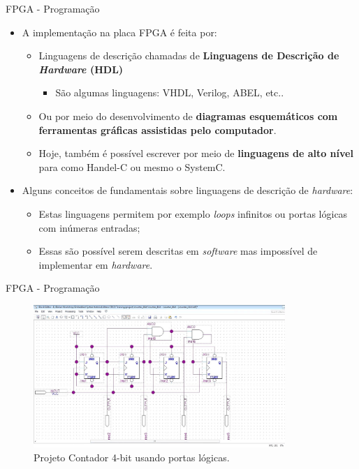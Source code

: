 	\begin{frame}{FPGA - Programação}
		\begin{itemize}
			\setlength\itemsep{1.0em}
			\item A implementação na placa FPGA é feita por:
			\begin{itemize}
				\setlength\itemsep{0.5em}
				\item Linguagens de descrição chamadas de \textbf{Linguagens de Descrição de \textit{Hardware} (HDL)}
				\begin{itemize}
					\item São algumas linguagens: VHDL, Verilog, ABEL, etc..
				\end{itemize}

				\item Ou por meio do desenvolvimento de \textbf{diagramas esquemáticos com ferramentas gráficas assistidas pelo computador}.

				\item Hoje, também é possível escrever por meio de \textbf{linguagens de alto nível} para como Handel-C ou mesmo o SystemC.
			\end{itemize}

			\item Alguns conceitos de fundamentais sobre linguagens de descrição de \textit{hardware}:
			\begin{itemize}
				\setlength\itemsep{0.5em}
				\item Estas linguagens permitem por exemplo \textit{loops} infinitos ou portas lógicas com inúmeras entradas;

				\item Essas são possível serem descritas em \textit{software} mas impossível de implementar em \textit{hardware}.
			\end{itemize}
		\end{itemize}
	\end{frame}

	\begin{frame}{FPGA - Programação}
		\begin{figure}[p]
			\centering
			\includegraphics[width=0.85\textwidth]{img/fpga/software_quartus_portas2.jpg}
			\caption{Projeto Contador 4-bit usando portas lógicas.}
			\label{fig:alteraquartus_portas2-2}
		\end{figure}
	\end{frame}

